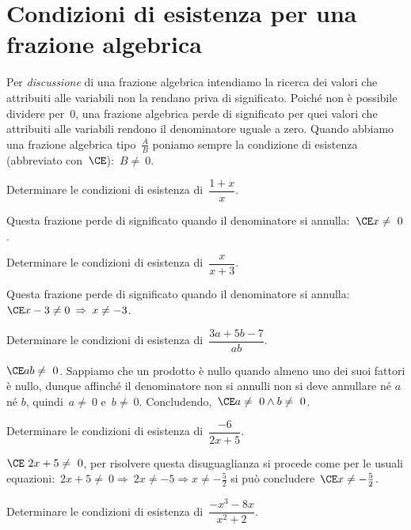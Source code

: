 \section{Condizioni di esistenza per una frazione algebrica}
Per \emph{discussione} di una frazione algebrica intendiamo la ricerca dei valori che attribuiti alle variabili non la rendano
priva di significato. Poiché non è possibile dividere per~$0$, una frazione algebrica perde di significato per quei valori
che attribuiti alle variabili rendono il denominatore uguale a zero. Quando abbiamo una frazione algebrica
tipo~$\frac{A}{B}$ poniamo sempre la condizione di esistenza (abbreviato con~$\CE$):~$B\neq~0$.

\begin{exrig}
 \begin{esempio}
Determinare le condizioni di esistenza di~$\dfrac{1+x}{x}$.

Questa frazione perde di significato quando il denominatore si annulla:~$\CE x\neq~0$.
 \end{esempio}

 \begin{esempio}
Determinare le condizioni di esistenza di~$\dfrac{x}{x+3}$.

Questa frazione perde di significato quando il denominatore si annulla:~$\CE x-3\neq 0\:\Rightarrow\: x\neq -3$.
 \end{esempio}

 \begin{esempio}
Determinare le condizioni di esistenza di~$\dfrac{3a+5b-7}{ab}$.

$\CE ab\neq~0$. Sappiamo che un prodotto è nullo quando almeno uno dei suoi fattori è nullo,
dunque affinché il denominatore non si annulli non si deve annullare né $a$ né $b$,
quindi~$a\neq~0$ e~$b\neq~0$. Concludendo,~$\CE a\neq~0\wedge b\neq~0$.
 \end{esempio}

 \begin{esempio}
Determinare le condizioni di esistenza di~$\dfrac{-6}{2x+5}$.

$\CE~2x+5\neq~0$, per risolvere questa disuguaglianza si procede come per le usuali
equazioni:~$2x+5\neq~0 \Rightarrow~2x\neq -5\Rightarrow x\neq -{\frac{5}{2}}$ si può concludere~$\CE x\neq -{\frac{5}{2}}$.
 \end{esempio}

 \begin{esempio}
Determinare le condizioni di esistenza di~$\dfrac{-x^{3}-8x}{x^{2}+2}$.


\end{esempio}
\end{exrig}
